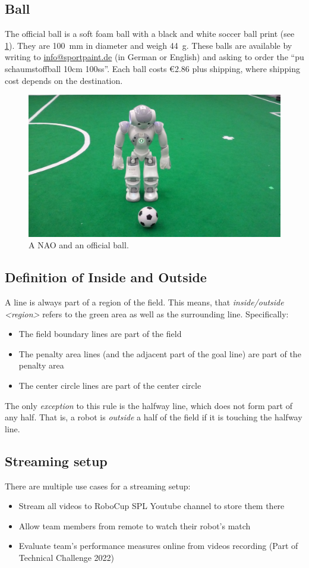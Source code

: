 \subsection{Ball}
\label{sec:ball}

The official ball is a soft foam ball with a black and white soccer ball print (see \cref{fig:ball}). They are \qty{100}{\milli\metre} in diameter and weigh \qty{44}{\gram}. These balls are available by writing to \url{info@sportpaint.de} (in German or English) and asking to order the ``pu schaumstoffball 10cm 100ss''.  Each ball costs \euro{2.86} plus shipping, where shipping cost depends on the destination.

\begin{figure}[t]
  \centerline{\includegraphics[height=0.28\columnwidth]{figs/robotWithBall2016.jpg}}
  \caption{A NAO and an official ball.}
  \label{fig:ball}
\end{figure}

\subsection{Definition of Inside and Outside}
\label{sec:inside_outside}

A line is always part of a region of the field.
This means, that \emph{inside/outside \textless region\textgreater} refers to the green area as well as the surrounding line.
Specifically:
\begin{itemize}
    \item The field boundary lines are part of the field
    \item The penalty area lines (and the adjacent part of the goal line) are part of the penalty area
    \item The center circle lines are part of the center circle
\end{itemize}

The only \textit{exception} to this rule is the halfway line, which does not form part of any half.
That is, a robot is \textit{outside} a half of the field if it is touching the halfway line.

\subsection{Streaming setup}
\label{sec:streaming_setup}

There are multiple use cases for a streaming setup:
\begin{itemize}
    \item Stream all videos to RoboCup SPL Youtube channel to store them there
    \item Allow team members from remote to watch their robot's match
    \item Evaluate team's performance measures online from videos recording (Part of Technical Challenge 2022)
\end{itemize}
